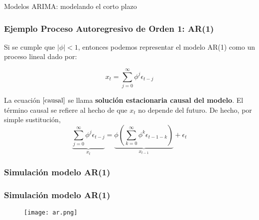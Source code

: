 \documentclass[spanish,xcolor=table]{beamer}
\begin{document}
\begin{section}{Modelos ARIMA: modelando el corto plazo}
\begin{frame}
\frametitle{Ejemplo Proceso Autoregresivo de Orden 1: AR(1)}

Si se cumple que $|\phi|< 1$, entonces podemos representar el modelo AR(1) como un proceso lineal dado por:

\begin{equation}
x_t = \sum_{j=0}^{\infty} \phi^j \epsilon_{t-j}
\label{causal}
\end{equation}

La ecuaci\'on $\eqref{causal}$ se llama \textbf{soluci\'on estacionaria causal del modelo}. El t\'ermino causal se refiere al hecho de que $x_t$ no depende del futuro. De hecho, por simple sustituci\'on,\\
\begin{equation}
\underbrace{\sum_{j=0}^{\infty} \phi^j\epsilon_{t-j}}_{x_t} = \underbrace{\phi\left(\sum_{k=0}^{\infty} \phi^k\epsilon_{t-1-k}\right)}_{x_{t-1}}+\epsilon_t
\end{equation}

\end{frame}

\begin{frame}
\frametitle{Simulaci\'on modelo AR(1) }


\end{frame}
\begin{frame}
\frametitle{Simulaci\'on modelo AR(1) }

\begin{figure}[t!]
\texttt{[image: ar.png]}
\end{figure}
 

\end{frame}
\end{section}
\end{document}
